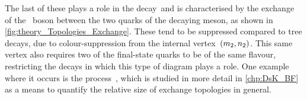 %
The last of these plays a role in the decay~\BsDsK and is characterised by the exchange of the \Wpm~boson between the two quarks of the decaying meson, as shown in \cref{fig:theory_Topologies_Exchange}.
These tend to be suppressed compared to tree decays, due to colour-suppression from the internal vertex~\({(m_{2}, n_{2})}\).
This same vertex also requires two of the final-state quarks to be of the same flavour, restricting the decays in which this type of diagram plays a role.
One example where it occurs is the process~\BdDsK, which is studied in more detail in \cref{chp:DsK_BF} as a means to quantify the relative size of exchange topologies in general.
%
\begin{figure}[hp] \centerfloat
    \begin{subfigure}{\textwidth} \centerfloat
        \setlength{\diagramsize}{3em}
        \setlength{\diagramheight}{1.5\baselineskip}
\end{subfigure}
\end{figure}
